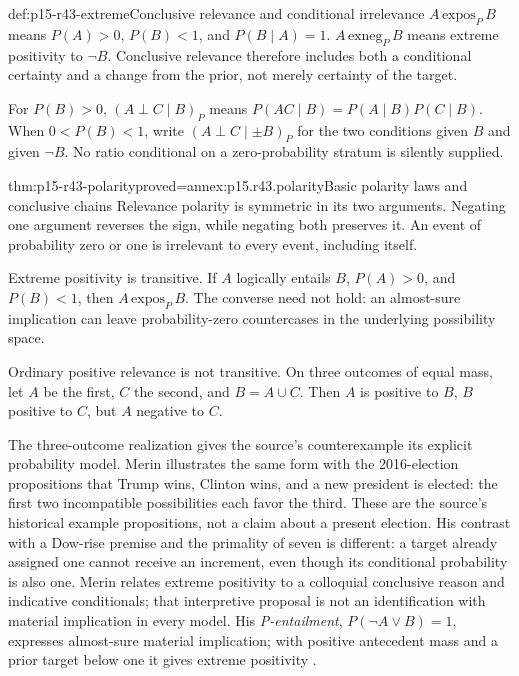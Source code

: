 \begin{hbdefinition}{def:p15-r43-extreme}{Conclusive relevance and conditional irrelevance}
\(A\,\mathrm{expos}_P\,B\) means
\(P(A)>0\), \(P(B)<1\), and \(P(B\mid A)=1\).
\(A\,\mathrm{exneg}_P\,B\) means extreme positivity to \(\neg B\).
Conclusive relevance therefore includes both a conditional certainty
and a change from the prior, not merely certainty of the target.

For \(P(B)>0\), \((A\perp C\mid B)_P\) means
\(P(AC\mid B)=P(A\mid B)P(C\mid B)\).
When \(0<P(B)<1\), write \((A\perp C\mid\pm B)_P\) for the two
conditions given \(B\) and given \(\neg B\). No ratio conditional
on a zero-probability stratum is silently supplied.
\end{hbdefinition}

\begin{hbtheorem}{thm:p15-r43-polarity}{proved=annex:p15.r43.polarity}{Basic polarity laws and conclusive chains}
Relevance polarity is symmetric in its two arguments. Negating one
argument reverses the sign, while negating both preserves it. An event
of probability zero or one is irrelevant to every event, including itself.

Extreme positivity is transitive. If \(A\) logically entails \(B\),
\(P(A)>0\), and \(P(B)<1\), then \(A\,\mathrm{expos}_P\,B\).
The converse need not hold: an almost-sure implication can leave
probability-zero countercases in the underlying possibility space.

Ordinary positive relevance is not transitive. On three outcomes of
equal mass, let \(A\) be the first, \(C\) the second, and \(B=A\cup C\).
Then \(A\) is positive to \(B\), \(B\) positive to \(C\), but \(A\)
negative to \(C\).
\end{hbtheorem}

The three-outcome realization gives the source's counterexample its
explicit probability model. Merin illustrates the same form with the
2016-election propositions that Trump wins, Clinton wins, and a new
president is elected: the first two incompatible possibilities each
favor the third. These are the source's historical example propositions,
not a claim about a present election. His contrast with a Dow-rise
premise and the primality of seven is different: a target already assigned
one cannot receive an increment, even though its conditional probability
is also one. Merin relates extreme positivity to a colloquial conclusive
reason and indicative conditionals; that interpretive proposal is not
an identification with material implication in every model. His
\emph{P-entailment}, \(P(\neg A\vee B)=1\), expresses almost-sure
material implication; with positive antecedent mass and a prior target
below one it gives extreme positivity
\parencite[pp.~265--267]{Merin2021Relevance}.

